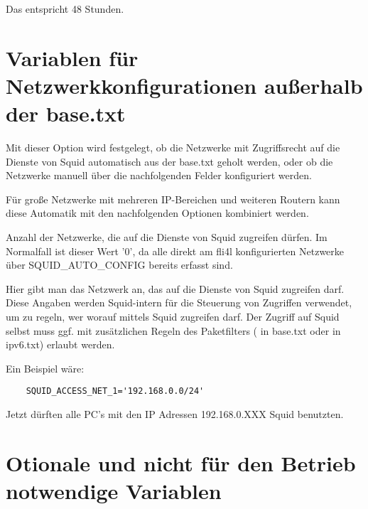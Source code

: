\begin{description}
                Das entspricht 48 Stunden.

\section{Variablen für Netzwerkkonfigurationen außerhalb der base.txt}


                Mit dieser Option wird festgelegt, ob die Netzwerke mit
                Zugriffsrecht auf die Dienste von Squid automatisch aus der
                base.txt geholt werden, oder ob die Netzwerke manuell über die
                nachfolgenden Felder konfiguriert werden.

                Für große Netzwerke mit mehreren IP-Bereichen und weiteren
                Routern kann diese Automatik mit den nachfolgenden Optionen
                kombiniert werden.



                Anzahl der Netzwerke, die auf die Dienste von Squid zugreifen
                dürfen. Im Normalfall ist dieser Wert '0', da alle direkt am
                fli4l konfigurierten Netzwerke über SQUID\_AUTO\_CONFIG bereits
                erfasst sind.



                Hier gibt man das Netzwerk an, das auf die Dienste von Squid
                zugreifen darf. Diese Angaben werden Squid-intern für die
                Steuerung von Zugriffen verwendet, um zu regeln, wer worauf
                mittels Squid zugreifen darf. Der Zugriff auf Squid selbst muss
                ggf. mit zusätzlichen Regeln des Paketfilters
                ( in base.txt oder  in
                ipv6.txt) erlaubt werden.

                Ein Beispiel wäre:
\begin{verbatim}
	SQUID_ACCESS_NET_1='192.168.0.0/24'
\end{verbatim}

                Jetzt dürften alle PC's mit den IP Adressen 192.168.0.XXX Squid
                benutzten.


\section{Otionale und nicht für den Betrieb notwendige Variablen}


\end{description}
